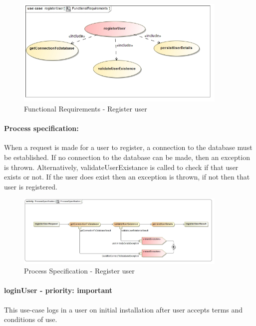 \documentclass[hidelinks, 12pt, oneside]{article}
\begin{document}
		
		\begin{figure}[!htbp]
    		\centering
    		\includegraphics[width=0.9\textwidth]{img/functionalRequirementsRegister.jpg}
    		\caption{Functional Requirements - Register user}
    		\label{fig:FunctionalReq_registerUser}
		\end{figure}
		
		
		
		\paragraph{Process specification:}		
		When a request is made for a user to register, a connection to the database must be established. If no connection to the database can be made, then an exception is thrown. Alternatively, validateUserExistance is called to check if that user exists or not. If the user does exist then an exception is thrown, if not then that user is registered.
		
		\begin{figure}[!htbp]
    		\centering
    		\includegraphics[width=0.9\textwidth]{img/processSpecificationRegisterUser.jpg}
    		\caption{Process Specification - Register user}
    		\label{fig:ProcessSpec_registerUser}
		\end{figure}
				
	
	\paragraph{loginUser - priority: important}
		This use-case logs in a user on initial installation after user accepts terms and conditions of use.
		
\end{document}
